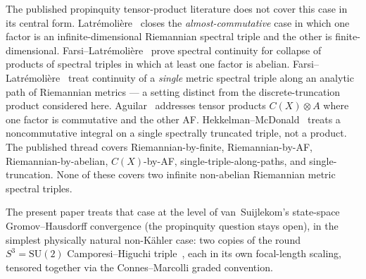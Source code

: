 \documentclass[11pt,a4paper]{article}
\theoremstyle{plain}
\theoremstyle{definition}
\newcommand{\sthree}{S^{3}}
\newcommand{\SU}{\mathrm{SU}}
\begin{document}
The published propinquity tensor-product literature does not cover
this case in its central form. Latr\'emoli\`ere~\cite{latremoliere2026}
closes the \emph{almost-commutative} case in which one factor is an
infinite-dimensional Riemannian spectral triple and the other is
finite-dimensional. Farsi--Latr\'emoli\`ere~\cite{farsi_latremoliere2024}
prove spectral continuity for collapse of products of spectral triples
in which at least one factor is abelian.
Farsi--Latr\'emoli\`ere~\cite{farsi_latremoliere2025} treat
continuity of a \emph{single} metric spectral triple along an analytic
path of Riemannian metrics --- a setting distinct from the
discrete-truncation product considered here.
Aguilar~\cite{aguilar2019} addresses tensor products $C(X) \otimes A$
where one factor is commutative and the other AF.
Hekkelman--McDonald~\cite{hekkelman_mcdonald2024b} treats a
noncommutative integral on a single spectrally truncated triple, not a
product. The published thread covers Riemannian-by-finite,
Riemannian-by-AF, Riemannian-by-abelian, $C(X)$-by-AF,
single-triple-along-paths, and single-truncation. None of these covers
two infinite non-abelian Riemannian metric spectral triples.

The present paper treats that case at the level of van~Suijlekom's
state-space Gromov--Hausdorff convergence (the propinquity question stays
open), in the simplest physically natural non-K\"ahler case: two copies of the round $\sthree = \SU(2)$
Camporesi--Higuchi triple~\cite{camporesi_higuchi1996}, each in its own
focal-length scaling, tensored together via the Connes--Marcolli
graded convention.
\end{document}
